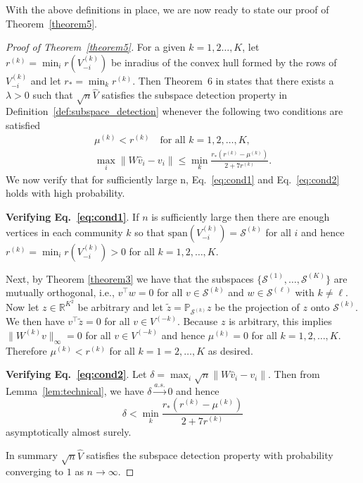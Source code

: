 \documentclass[12pt]{article}
\begin{document}
With the above definitions in place, we are now ready to state our
proof of Theorem~\ref{theorem5}.

\begin{proof}[Proof of Theorem~\ref{theorem5}]
For a given $k = 1,2\dots,K$, let $r^{(k)} = \min_{i}r(V_{-i}^{(k)})$ be inradius of the convex hull formed by
the rows of $V_{-i}^{(k)}$ and let $r_* = \min_{k} r^{(k)}$. Then Theorem~6 in
\citet{jmlr-v28-wang13} states that there exists a $\lambda > 0$
such that $\sqrt{n} \hat{V}$ satisfies
the subspace detection property in
Definition~\ref{def:subspace_detection} whenever
the following two conditions are satisfied
\begin{gather}
  \label{eq:cond1}
  \mu^{(k)} < r^{(k)} \quad \text{for all $k = 1,2,\dots,K$}, \\
  \label{eq:cond2}
  \max_{i} \|W \hat{v}_{i} - v_{i}\| \leq \min_{k} \frac{r_*(r^{(k)} -
    \mu^{(k)})}{2 + 7 r^{(k)}}.
\end{gather}
We now verify that for sufficiently large n, Eq.~\eqref{eq:cond1} and Eq.~\eqref{eq:cond2}
holds with high probability.

{\bf Verifying Eq.~\eqref{eq:cond1}}. If $n$ is sufficiently large then
there are enough vertices in each community $k$ so that
$\mathrm{span}(V_{-i}^{(k)}) = \mathcal{S}^{(k)}$ for all $i$ and hence
\(r^{(k)} = \min_{i} r(V_{-i}^{(k)}) > 0\) for
all $k = 1,2,\dots,K$. 

Next, by Theorem \ref{theorem3} we have that the subspaces
$\{\mathcal{S}^{(1)}, \dots, \mathcal{S}^{(K)}\}$
are mutually orthogonal, i.e., $v^{\top} w = 0$ for all $v \in
\mathcal{S}^{(k)}$ and $w \in \mathcal{S}^{(\ell)}$ with $k \not =
\ell$. Now let $z \in \mathbb{R}^{K^2}$ be arbitrary and let
$\tilde{z} = \mathbb{P}_{\mathcal{S}^{(k)}} z$ be the projection of
$z$ onto $\mathcal{S}^{(k)}$. We then have $v^{\top} \tilde{z} =
0$ for all $v \in V^{(-k)}$. Because $z$ is arbitrary, this implies 
$\|W^{(k)} v\|_{\infty} = 0$ for all $v
\in V^{(-k)}$ and hence $\mu^{(k)} = 0$ for all $k
=1,2,\dots,K$. Therefore $\mu^{(k)} < r^{(k)}$ for all $k =
1=2,\dots,K$ as desired.

{\bf Verifying Eq.~\eqref{eq:cond2}}.
Let $\delta = \max_{i} \sqrt{n} \|W
\hat{v}_{i} - v_{i}\|$. Then from Lemma~\ref{lem:technical}, we have
\(\delta \stackrel{a.s.}{\to} 0\) and hence
$$\delta < \min_{k} \frac{r_* (r^{(k)} - \mu^{(k)})}{2 + 7 r^{(k)}}$$
asymptotically almost surely. 

In summary $\sqrt{n} \hat{V}$ satisfies the subspace detection property
with probability converging to $1$ as \(n \to \infty\).
\end{proof}
\end{document}
